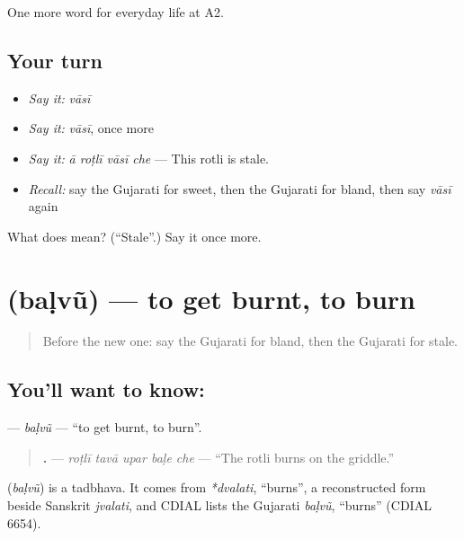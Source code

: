 \begin{grammarlens}[title={What you've built}]
One more word for everyday life at A2.
\end{grammarlens}

\subsection*{Your turn}
\begin{itemize}
\raggedright
  \item \emph{Say it:} \emph{vāsī}
  \item \emph{Say it:} \emph{vāsī}, once more
  \item \emph{Say it:} \emph{ā roṭlī vāsī che} — This rotli is stale.
  \item \emph{Recall:} say the Gujarati for sweet, then the Gujarati for bland, then say \emph{vāsī} again
\end{itemize}

\begin{tcolorbox}[breakable,colback=teal!4,colframe=teal!35!black,title={Before you move on}]
What does  mean? (\textquotedblleft{}Stale\textquotedblright{}.) Say it once more.
\end{tcolorbox}
\section[\texorpdfstring{\gu{બળવું} (baḷvũ)}{બળવું (baḷvũ)}]{ (baḷvũ) — to get burnt, to burn}

\label{lesson:GU-C172-balvu}



\begin{quote}
Before the new one: say the Gujarati for bland, then the Gujarati for stale.
\end{quote}

\subsection*{You'll want to know: }
\textbf{} — \emph{baḷvũ} — \textquotedblleft{}to get burnt, to burn\textquotedblright{}.

\begin{quote}
\textbf{    .} — \emph{roṭlī tavā upar baḷe che} — \textquotedblleft{}The rotli burns on the griddle.\textquotedblright{}
\end{quote}

\begin{cousinweb}
\textbf{} (\emph{baḷvũ}) is a tadbhava. It comes from \emph{*dvalati}, \textquotedblleft{}burns\textquotedblright{}, a reconstructed form beside Sanskrit \emph{jvalati}, and CDIAL lists the Gujarati \emph{baḷvũ}, \textquotedblleft{}burns\textquotedblright{} (CDIAL 6654).
\end{cousinweb}

